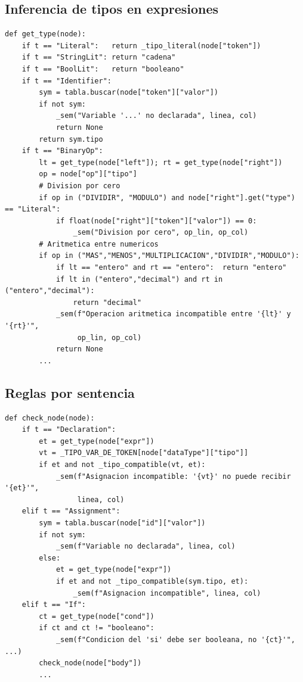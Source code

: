\documentclass[11pt,a4paper]{article}
\begin{document}
\subsection{Inferencia de tipos en expresiones}

\begin{lstlisting}[style=py]
def get_type(node):
    if t == "Literal":   return _tipo_literal(node["token"])
    if t == "StringLit": return "cadena"
    if t == "BoolLit":   return "booleano"
    if t == "Identifier":
        sym = tabla.buscar(node["token"]["valor"])
        if not sym:
            _sem("Variable '...' no declarada", linea, col)
            return None
        return sym.tipo
    if t == "BinaryOp":
        lt = get_type(node["left"]); rt = get_type(node["right"])
        op = node["op"]["tipo"]
        # Division por cero
        if op in ("DIVIDIR", "MODULO") and node["right"].get("type") == "Literal":
            if float(node["right"]["token"]["valor"]) == 0:
                _sem("Division por cero", op_lin, op_col)
        # Aritmetica entre numericos
        if op in ("MAS","MENOS","MULTIPLICACION","DIVIDIR","MODULO"):
            if lt == "entero" and rt == "entero":  return "entero"
            if lt in ("entero","decimal") and rt in ("entero","decimal"):
                return "decimal"
            _sem(f"Operacion aritmetica incompatible entre '{lt}' y '{rt}'",
                 op_lin, op_col)
            return None
        ...
\end{lstlisting}

\subsection{Reglas por sentencia}

\begin{lstlisting}[style=py]
def check_node(node):
    if t == "Declaration":
        et = get_type(node["expr"])
        vt = _TIPO_VAR_DE_TOKEN[node["dataType"]["tipo"]]
        if et and not _tipo_compatible(vt, et):
            _sem(f"Asignacion incompatible: '{vt}' no puede recibir '{et}'",
                 linea, col)
    elif t == "Assignment":
        sym = tabla.buscar(node["id"]["valor"])
        if not sym:
            _sem(f"Variable no declarada", linea, col)
        else:
            et = get_type(node["expr"])
            if et and not _tipo_compatible(sym.tipo, et):
                _sem(f"Asignacion incompatible", linea, col)
    elif t == "If":
        ct = get_type(node["cond"])
        if ct and ct != "booleano":
            _sem(f"Condicion del 'si' debe ser booleana, no '{ct}'", ...)
        check_node(node["body"])
        ...
\end{lstlisting}
\end{document}
